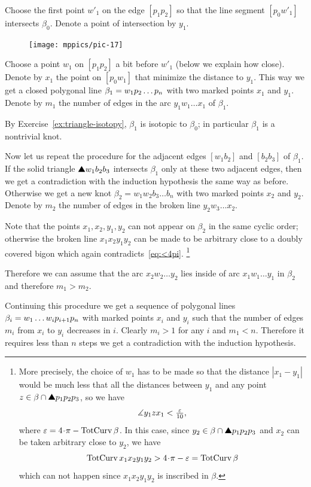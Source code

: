 Choose the first point $w'_1$ on the edge $[p_1p_2]$ so that the line segment $[p_0w'_1]$ 
intersects $\beta_0$.
Denote a point of intersection by $y_1$.

\begin{figure}
\vskip-0mm
\centering
\texttt{[image: mppics/pic-17]}
\vskip0mm
\end{figure}

Choose a point $w_1$ on $[p_1p_2]$ a bit before $w'_1$
(below we explain how close).
Denote by $x_1$ the point on $[p_0w_1]$ that minimize the distance to $y_1$.
This way we get a closed polygonal line 
$\beta_1\z=w_1p_2\dots p_n$ with two marked points $x_1$ and $y_1$.
Denote by $m_1$ the number of edges in the arc $y_1w_1\dots x_1$ of $\beta_1$.

By Exercise~\ref{ex:triangle-isotopy}, $\beta_1$ is isotopic to $\beta_0$;
in particular $\beta_1$ is a nontrivial knot.

Now let us repeat the procedure for the adjacent edges $[w_1b_2]$ and $[b_2b_3]$ of $\beta_1$.
If the solid triangle $\solidtriangle w_1b_2b_3$ intersects $\beta_1$ only at these two adjacent edges, then we get a contradiction with the induction hypothesis the same way as before.
Otherwise we get a new knot $\beta_2=w_1w_2b_3\dots b_n$ with two marked points $x_2$ and $y_2$.
Denote by $m_2$ the number of edges in the broken line $y_2w_3\dots x_2$.

Note that the points $x_1,x_2,y_1,y_2$ can not appear on $\beta_2$ in the same cyclic order;
otherwise the broken line $x_1x_2y_1y_2$ can be made to be arbitrary close to a doubly covered bigon which again contradicts~\ref{eq:<4pi}.%
\footnote{More precisely, the choice of $w_1$ has to be made so that the distance $|x_1-y_1|$ would be much less that all the distances between $y_1$ and any point $z\in\beta\cap \solidtriangle p_1p_2p_3$, so we have
\[\measuredangle y_1zx_1<\tfrac{\varepsilon}{10},\]
where $\eps=4\cdot\pi-\tc\beta$.
In this case, since $y_2\in \beta\cap \solidtriangle p_1p_2p_3$ and $x_2$ can be taken arbitrary close to $y_2$, we have
\[\tc x_1x_2y_1y_2 > 4\cdot\pi -\eps= \tc\beta\]
which can not happen since $x_1x_2y_1y_2$ is inscribed in $\beta$.}

Therefore we can assume that the arc $x_2w_2\dots y_2$ lies inside of arc $x_1w_1\dots y_1$ in $\beta_2$
and therefore $m_1>m_2$.

Continuing this procedure we get a sequence of polygonal lines $\beta_i\z=w_1\dots w_i p_{i+1}p_n$ with marked points $x_i$ and $y_i$ such that the number of edges $m_i$ from $x_i$ to $y_i$ decreases in $i$.
Clearly $m_i>1$ for any $i$ and $m_1<n$.
Therefore it requires less than $n$ steps we get a contradiction with the induction hypothesis.
\qeds

